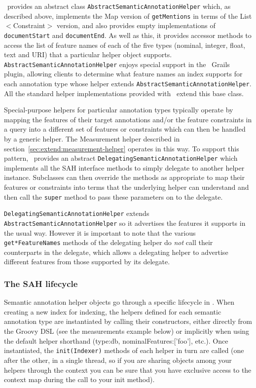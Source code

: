 \Mimir\ provides an abstract class {\tt AbstractSemanticAnnotationHelper}
which, as described above, implements the Map version of {\tt getMentions} in
terms of the List$<$Constraint$>$ version, and also provides empty
implementations of {\tt documentStart} and {\tt documentEnd}.  As well as this,
it provides accessor methods to access the list of feature names of each of the
five types (nominal, integer, float, text and URI) that a particular helper
object supports.  {\tt AbstractSemanticAnnotationHelper} enjoys special support
in the \Mimir\ Grails plugin, allowing clients to determine what feature names
an index supports for each annotation type whose helper extends
{\tt AbstractSemanticAnnotationHelper}.  All the standard helper
implementations provided with \Mimir\ extend this base class.

Special-purpose helpers for particular annotation types typically operate by
mapping the features of their target annotations and/or the feature constraints
in a query into a different set of features or constraints which can then be
handled by a generic helper.  The Measurement helper described in
section~\ref{sec:extend:measurement-helper} operates in this way.  To support
this pattern, \Mimir\ provides an abstract
{\tt DelegatingSemanticAnnotationHelper} which implements all the SAH interface
methods to simply delegate to another helper instance.  Subclasses can then
override the methods as appropriate to map their features or constraints into
terms that the underlying helper can understand and then call the {\tt super}
method to pass these parameters on to the delegate.

{\tt DelegatingSemanticAnnotationHelper} extends
{\tt AbstractSemanticAnnotationHelper} so it advertises the features it
supports in the usual way.  However it is important to note that the various
\verb|get*FeatureNames| methods of the delegating helper do {\em not} call
their counterparts in the delegate, which allows a delegating helper to
advertise different features from those supported by its delegate.

\subsubsection{The SAH lifecycle}

Semantic annotation helper objects go through a specific lifecycle in \Mimir.
When creating a new index for indexing, the helpers defined for each semantic
annotation type are instantiated by calling their constructors, either directly
from the Groovy DSL (see the measurements example below) or implicitly when
using the default helper shorthand (type:db, nominalFeatures:['foo'], etc.).
Once instantiated, the {\tt init(Indexer)} methods of each helper in turn are
called (one after the other, in a single thread, so if you are sharing objects
among your helpers through the context you can be sure that you have exclusive
access to the context map during the call to your init method).

